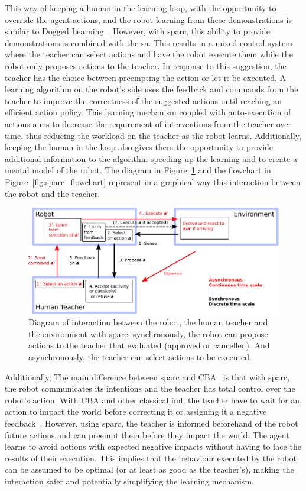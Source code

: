 This way of keeping a human in the learning loop, with the opportunity to override the agent actions, and the robot learning from these demonstrations is similar to Dogged Learning~\citep{grollman2007dogged}. However, with \gls{sparc}, this ability to provide demonstrations is combined with the \gls{sa}. This results in a mixed control system where the teacher can select actions and have the robot execute them while the robot only proposes actions to the teacher. In response to this suggestion, the teacher has the choice between preempting the action or let it be executed. A learning algorithm on the robot's side uses the feedback and commands from the teacher to improve the correctness of the suggested actions until reaching an efficient action policy. This learning mechanism coupled with auto-execution of actions aims to decrease the requirement of interventions from the teacher over time, thus reducing the workload on the teacher as the robot learns. Additionally, keeping the human in the loop also gives them the opportunity to provide additional information to the algorithm speeding up the learning and to create a mental model of the robot. The diagram in Figure~\ref{fig:sparc_diagram} and the flowchart in Figure~\ref{fig:sparc_flowchart} represent in a graphical way this interaction between the robot and the teacher.

\begin{figure}[ht]
	\includegraphics[width=1\linewidth]{diagram.pdf}
	\centering
	\caption{Diagram of interaction between the robot, the human teacher and the environment with \gls{sparc}: synchronously, the robot can propose actions to the teacher that evaluated (approved or cancelled). And asynchronously, the teacher can select actions to be executed.}
	\label{fig:sparc_diagram}
\end{figure}

Additionally, The main difference between \gls{sparc} and CBA~\citep{chernova2009interactive} is that with \gls{sparc}, the robot communicates its intentions and the teacher has total control over the robot's action. With CBA and other classical \gls{iml}, the teacher have to wait for an action to impact the world before correcting it or assigning it a negative feedback~\citep{thomaz2008teachable,knox2009interactively}. However, using \gls{sparc}, the teacher is informed beforehand of the robot future actions and can preempt them before they impact the world. The agent learns to avoid actions with expected negative impacts without having to face the results of their execution. This implies that the behaviour executed by the robot can be assumed to be optimal (or at least as good as the teacher's), making the interaction safer and potentially simplifying the learning mechanism.

